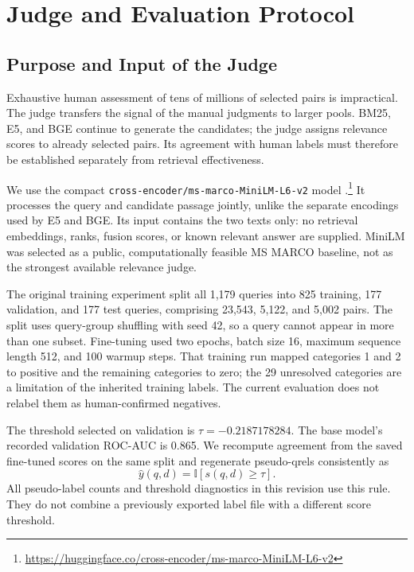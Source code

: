 \documentclass[runningheads,a4paper]{llncs}
\begin{document}
\section{Judge and Evaluation Protocol}
\label{sec:protocol}

\subsection{Purpose and Input of the Judge}
\label{sec:judge-method}

Exhaustive human assessment of tens of millions of selected pairs is impractical. The judge transfers the signal of the manual judgments to larger pools. BM25, E5, and BGE continue to generate the candidates; the judge assigns relevance scores to already selected pairs. Its agreement with human labels must therefore be established separately from retrieval effectiveness.

We use the compact \texttt{cross-encoder/ms-marco-MiniLM-L6-v2} model \cite{wang2020minilm,reimers2019sentencebert}.\footnote{\url{https://huggingface.co/cross-encoder/ms-marco-MiniLM-L6-v2}} It processes the query and candidate passage jointly, unlike the separate encodings used by E5 and BGE. Its input contains the two texts only: no retrieval embeddings, ranks, fusion scores, or known relevant answer are supplied. MiniLM was selected as a public, computationally feasible MS MARCO baseline, not as the strongest available relevance judge.

The original training experiment split all 1,179 queries into 825 training, 177 validation, and 177 test queries, comprising 23,543, 5,122, and 5,002 pairs. The split uses query-group shuffling with seed 42, so a query cannot appear in more than one subset. Fine-tuning used two epochs, batch size 16, maximum sequence length 512, and 100 warmup steps. That training run mapped categories 1 and 2 to positive and the remaining categories to zero; the 29 unresolved categories are a limitation of the inherited training labels. The current evaluation does not relabel them as human-confirmed negatives.

The threshold selected on validation is \(\tau=-0.2187178284\). The base model's recorded validation ROC-AUC is 0.865. We recompute agreement from the saved fine-tuned scores on the same split and regenerate pseudo-qrels consistently as
\begin{equation}
\hat y(q,d)=\mathbb{I}[s(q,d)\geq\tau].
\label{eq:judge}
\end{equation}
All pseudo-label counts and threshold diagnostics in this revision use this rule. They do not combine a previously exported label file with a different score threshold.
\end{document}
